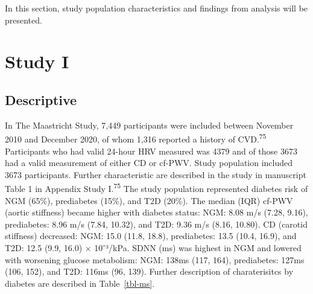 \documentclass[
  letterpaper,
  headsepline=true,
  open=any]{scrbook}
\begin{document}
\newpage

In this section, study population characteristics and findings from
analysis will be presented.

\hypertarget{study-i}{%
\section{Study I}\label{study-i}}

\hypertarget{descriptive}{%
\subsection{Descriptive}\label{descriptive}}

In The Maastricht Study, 7,449 participants were included between
November 2010 and December 2020, of whom 1,316 reported a history of
CVD.\textsuperscript{75} Participants who had valid 24-hour HRV measured
was 4379 and of those 3673 had a valid measurement of either CD or
cf-PWV. Study population included 3673 participants. Further
characteristic are described in the study in manuscript Table 1 in
Appendix Study I.\textsuperscript{75} The study population represented
diabetes risk of NGM (65\%), prediabetes (15\%), and T2D (20\%). The
median (IQR) cf-PWV (aortic stiffness) became higher with diabetes
status: NGM: 8.08 m/s (7.28, 9.16), prediabetes: 8.96 m/s (7.84, 10.32),
and T2D: 9.36 m/s (8.16, 10.80). CD (carotid stiffness) decreased: NGM:
15.0 (11.8, 18.8), prediabetes: 13.5 (10.4, 16.9), and T2D: 12.5 (9.9,
16.0) × 10⁻³/kPa. SDNN (ms) was highest in NGM and lowered with
worsening glucose metabolism: NGM: 138ms (117, 164), prediabetes: 127ms
(106, 152), and T2D: 116ms (96, 139). Further description of
charaterisitcs by diabetes are described in Table~\ref{tbl-ms}.

\end{document}
